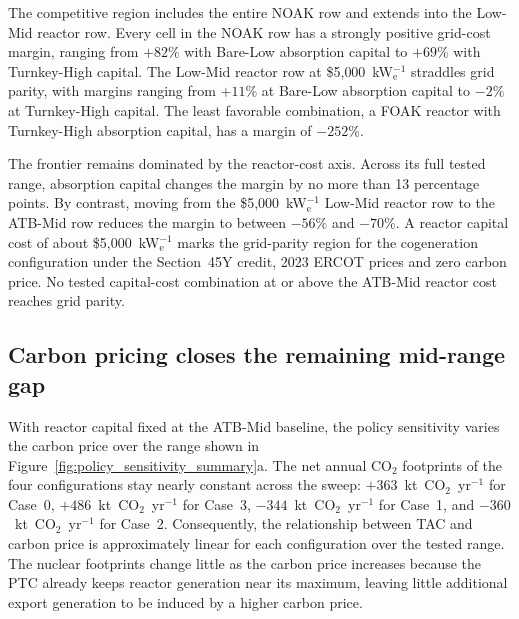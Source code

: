 \documentclass[a4paper,fleqn]{cas-sc}
\begin{document}
The competitive region includes the entire NOAK row and extends into the Low-Mid reactor row. Every cell in the NOAK row has a strongly positive grid-cost margin, ranging from $+82\%$ with Bare-Low absorption capital to $+69\%$ with Turnkey-High capital. The Low-Mid reactor row at \$5{,}000~kW$_\mathrm{e}^{-1}$ straddles grid parity, with margins ranging from $+11\%$ at Bare-Low absorption capital to $-2\%$ at Turnkey-High capital. The least favorable combination, a FOAK reactor with Turnkey-High absorption capital, has a margin of $-252\%$.

The frontier remains dominated by the reactor-cost axis. Across its full tested range, absorption capital changes the margin by no more than 13 percentage points. By contrast, moving from the \$5{,}000~kW$_\mathrm{e}^{-1}$ Low-Mid reactor row to the ATB-Mid row reduces the margin to between $-56\%$ and $-70\%$. A reactor capital cost of about \$5{,}000~kW$_\mathrm{e}^{-1}$ marks the grid-parity region for the cogeneration configuration under the Section~45Y credit, 2023 ERCOT prices and zero carbon price. No tested capital-cost combination at or above the ATB-Mid reactor cost reaches grid parity.

\subsection{Carbon pricing closes the remaining mid-range gap}
\label{sec:results:policy}

With reactor capital fixed at the ATB-Mid baseline, the policy sensitivity varies the carbon price over the range shown in Figure~\ref{fig:policy_sensitivity_summary}a. The net annual CO$_2$ footprints of the four configurations stay nearly constant across the sweep: $+363$~kt~CO$_2$~yr$^{-1}$ for Case~0, $+486$~kt~CO$_2$~yr$^{-1}$ for Case~3, $-344$~kt~CO$_2$~yr$^{-1}$ for Case~1, and $-360$~kt~CO$_2$~yr$^{-1}$ for Case~2. Consequently, the relationship between TAC and carbon price is approximately linear for each configuration over the tested range. The nuclear footprints change little as the carbon price increases because the PTC already keeps reactor generation near its maximum, leaving little additional export generation to be induced by a higher carbon price.
\end{document}
